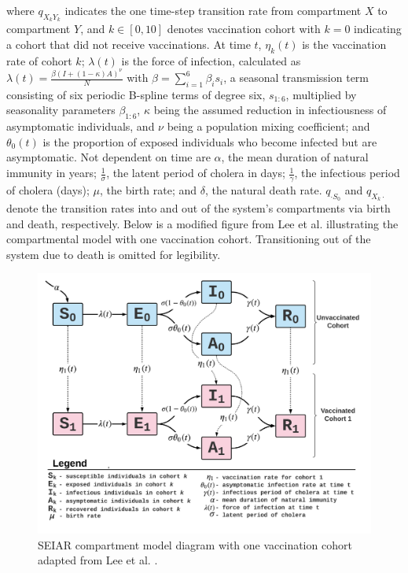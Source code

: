 \documentclass[12pt]{article}
\begin{document}
where $q_{X_kY_k}$ indicates the one time-step transition rate from compartment $X$ to compartment $Y$, and $k \in [0, 10]$ denotes vaccination cohort with $k = 0$ indicating a cohort that did not receive vaccinations. At time $t$, $\eta_k(t)$ is the vaccination rate of cohort $k$; $\lambda (t)$ is the force of infection, calculated as $\lambda (t) = \frac{\beta(I + (1-\kappa)A)^\nu}{N}$ with $\beta = \sum_{i = 1}^6 \beta_i s_i$, a seasonal transmission term consisting of six periodic B-spline terms of degree six, $s_{1:6}$, multiplied by seasonality parameters $\beta_{1:6}$, $\kappa$ being the assumed reduction in infectiousness of asymptomatic individuals, and $\nu$ being a population mixing coefficient; and $\theta_0(t)$ is the proportion of exposed individuals who become infected but are asymptomatic. Not dependent on time are $\alpha$, the mean duration of natural immunity in years; $\frac{1}{\sigma}$, the latent period of cholera in days; $\frac{1}{\gamma}$, the infectious period of cholera (days); $\mu$, the birth rate; and $\delta$, the natural death rate. $q_{\cdot S_0}$ and $q_{X_k \cdot}$ denote the transition rates into and out of the system's compartments via birth and death, respectively. Below is a modified figure from Lee et al. illustrating the compartmental model with one vaccination cohort. Transitioning out of the system due to death is omitted for legibility.
        \begin{figure}[H]
          \centering
          \includegraphics[width=170mm]{SEIAR.png}
          \caption{SEIAR compartment model diagram with one vaccination cohort adapted from Lee et al. \cite{Lee_supp}.}
        \end{figure}
\end{document}
